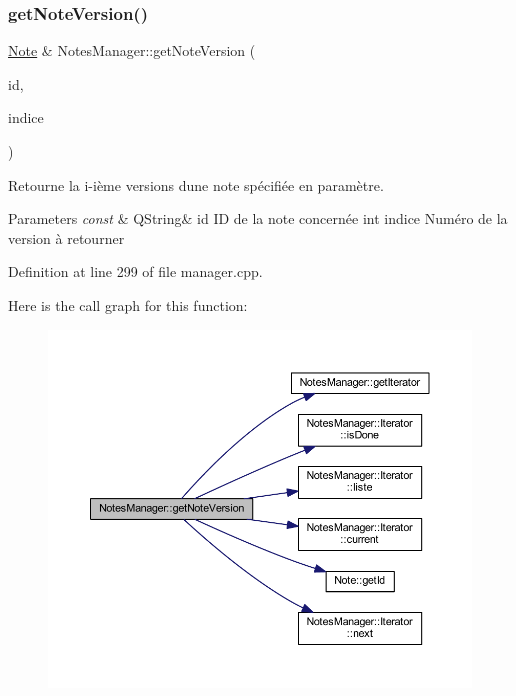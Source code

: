 \subsubsection{\texorpdfstring{get\+Note\+Version()}{getNoteVersion()}}
{\footnotesize\ttfamily \hyperlink{class_note}{Note} \& Notes\+Manager\+::get\+Note\+Version (\begin{DoxyParamCaption}\item[{const Q\+String \&}]{id,  }\item[{int}]{indice }\end{DoxyParamCaption})}



Retourne la i-\/ième versions d\textquotesingle{}une note spécifiée en paramètre. 


\begin{DoxyParams}{Parameters}
{\em const} & Q\+String\& id ID de la note concernée int indice Numéro de la version à retourner \\
\hline
\end{DoxyParams}


Definition at line 299 of file manager.\+cpp.

Here is the call graph for this function\+:
\nopagebreak
\begin{figure}[H]
\begin{center}
\leavevmode
\includegraphics[width=350pt]{class_notes_manager_a0461145357fe17bf07c3b09c665b95db_cgraph}
\end{center}
\end{figure}
\mbox{\label{class_notes_manager_ad4fb2de50633dd25b71024343341cd64}} 
